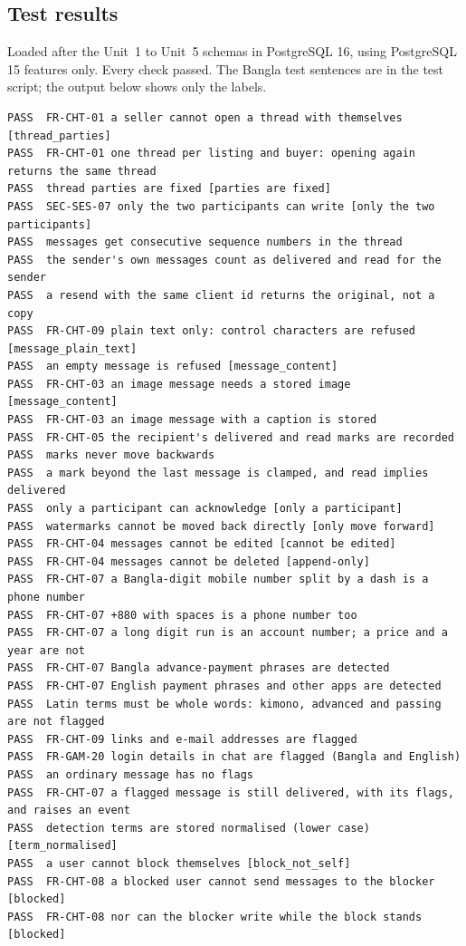 \documentclass[11pt,a4paper]{article}
\begin{document}
\subsection{Test results}
\label{app:tests}
Loaded after the Unit~1 to Unit~5 schemas in PostgreSQL 16, using PostgreSQL 15 features only. Every check passed. The Bangla test sentences are in the test script; the output below shows only the labels.
{\scriptsize
\begin{verbatim}
PASS  FR-CHT-01 a seller cannot open a thread with themselves [thread_parties]
PASS  FR-CHT-01 one thread per listing and buyer: opening again returns the same thread
PASS  thread parties are fixed [parties are fixed]
PASS  SEC-SES-07 only the two participants can write [only the two participants]
PASS  messages get consecutive sequence numbers in the thread
PASS  the sender's own messages count as delivered and read for the sender
PASS  a resend with the same client id returns the original, not a copy
PASS  FR-CHT-09 plain text only: control characters are refused [message_plain_text]
PASS  an empty message is refused [message_content]
PASS  FR-CHT-03 an image message needs a stored image [message_content]
PASS  FR-CHT-03 an image message with a caption is stored
PASS  FR-CHT-05 the recipient's delivered and read marks are recorded
PASS  marks never move backwards
PASS  a mark beyond the last message is clamped, and read implies delivered
PASS  only a participant can acknowledge [only a participant]
PASS  watermarks cannot be moved back directly [only move forward]
PASS  FR-CHT-04 messages cannot be edited [cannot be edited]
PASS  FR-CHT-04 messages cannot be deleted [append-only]
PASS  FR-CHT-07 a Bangla-digit mobile number split by a dash is a phone number
PASS  FR-CHT-07 +880 with spaces is a phone number too
PASS  FR-CHT-07 a long digit run is an account number; a price and a year are not
PASS  FR-CHT-07 Bangla advance-payment phrases are detected
PASS  FR-CHT-07 English payment phrases and other apps are detected
PASS  Latin terms must be whole words: kimono, advanced and passing are not flagged
PASS  FR-CHT-09 links and e-mail addresses are flagged
PASS  FR-GAM-20 login details in chat are flagged (Bangla and English)
PASS  an ordinary message has no flags
PASS  FR-CHT-07 a flagged message is still delivered, with its flags, and raises an event
PASS  detection terms are stored normalised (lower case) [term_normalised]
PASS  a user cannot block themselves [block_not_self]
PASS  FR-CHT-08 a blocked user cannot send messages to the blocker [blocked]
PASS  FR-CHT-08 nor can the blocker write while the block stands [blocked]

\end{verbatim}}
\end{document}
